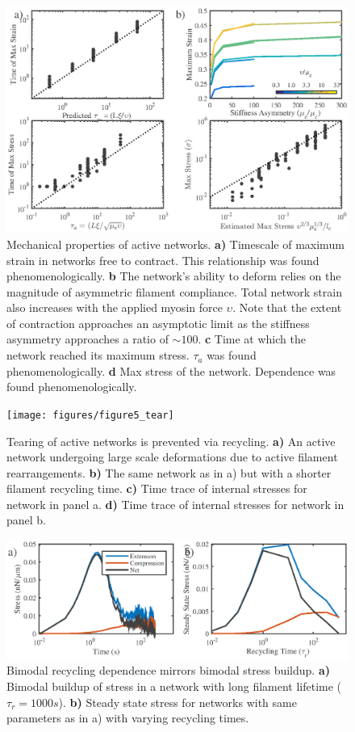 \documentclass[10pt,letterpaper]{article}
\begin{document}
\begin{figure}[h!]
\centering
\includegraphics[width=\hsize]{figures/figureS2}
\caption{\label{fig:active_supp}  Mechanical properties of active networks.  \textbf{a)}  Timescale of maximum strain in networks free to contract.  This relationship was found phenomenologically.   \textbf{b} The network's ability to deform relies on the magnitude of asymmetric filament compliance.  Total network strain also increases with the applied myosin force $\upsilon$. Note that the extent of contraction approaches an asymptotic limit as the stiffness asymmetry approaches a ratio of $\sim 100$.   \textbf{c}  Time at which the network reached its maximum stress. $\tau_a$ was found phenomenologically. \textbf{d} Max stress of the network.  Dependence was found phenomenologically. }
\end{figure}

\begin{figure}[h!]
\centering
\texttt{[image: figures/figure5\_tear]}
\caption{\label{fig:active_tear}  Tearing of active networks is prevented via recycling.  \textbf{a)}  An active network undergoing large scale deformations due to active filament rearrangements.  \textbf{b)}  The same network as in a) but with a shorter filament recycling time.  \textbf{c)}  Time trace of internal stresses for network in panel a.  \textbf{d)}   Time trace of internal stresses for network in panel b.  }
\end{figure}

\begin{figure}[h!]
\centering
\includegraphics[width=\hsize]{figures/figure7S}
\caption{\label{fig:recycle_supp}  Bimodal recycling dependence mirrors bimodal stress buildup.  \textbf{a)}  Bimodal buildup of stress in a network with long filament lifetime ($\tau_r = 1000s$).  \textbf{b)}  Steady state stress for networks with same parameters as in a) with varying recycling times.   }
\end{figure}
\end{document}
